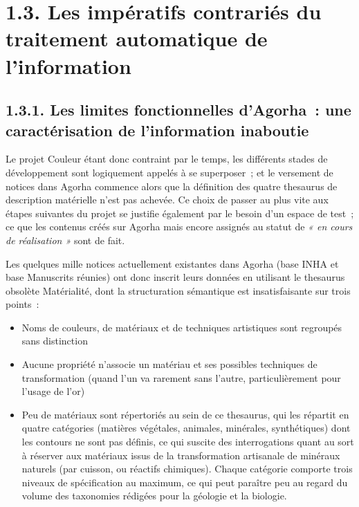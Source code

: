 \documentclass[a4paper,12pt, twoside]{book}
\begin{document}
\section*{1.3. Les impératifs contrariés du traitement automatique de l’information}

\subsection*{1.3.1. Les limites fonctionnelles d’Agorha~: une caractérisation de l’information inaboutie}

Le projet Couleur étant donc contraint par le temps, les différents stades de développement sont logiquement appelés à se superposer~; et le versement de notices dans Agorha commence alors que la définition des quatre thesaurus de description matérielle n’est pas achevée. Ce choix de passer au plus vite aux étapes suivantes du projet se justifie également par le besoin d’un espace de test~; ce que les contenus créés sur Agorha mais encore assignés au statut de \textit{« en cours de réalisation »} sont de fait.

Les quelques mille notices actuellement existantes dans Agorha (base INHA et base Manuscrits réunies) ont donc inscrit leurs données en utilisant le thesaurus obsolète \textsf{Matérialité}, dont la structuration sémantique est insatisfaisante sur trois points~:

\begin{itemize}
    \item Noms de couleurs, de matériaux et de techniques artistiques sont regroupés sans distinction\\
    
    \item Aucune propriété n’associe un matériau et ses possibles techniques de transformation (quand l’un va rarement sans l’autre, particulièrement pour l’usage de l’or)\\
    
    \item  Peu de matériaux sont répertoriés au sein de ce thesaurus, qui les répartit en quatre catégories (matières végétales, animales, minérales, synthétiques) dont les contours ne sont pas définis, ce qui suscite des interrogations quant au sort à réserver aux matériaux issus de la transformation artisanale de minéraux naturels (par cuisson, ou réactifs chimiques). Chaque catégorie comporte trois niveaux de spécification au maximum, ce qui peut paraître peu au regard du volume des taxonomies rédigées pour la géologie et la biologie.
\end{itemize}
\end{document}
